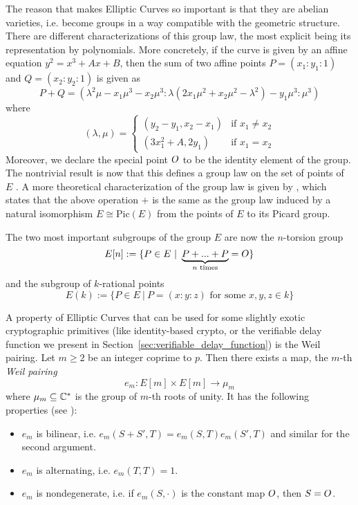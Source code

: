 The reason that makes Elliptic Curves so important is that they are abelian varieties, i.e. become groups in a way compatible with the geometric structure.
There are different characterizations of this group law, the most explicit being its representation by polynomials.
More concretely, if the curve is given by an affine equation $y^2 = x^3 + Ax + B$, then the sum of two affine points $P = (x_1 : y_1 : 1)$ and $Q = (x_2 : y_2 : 1)$ is given as
\begin{equation*}
    P + Q = ( \lambda^2\mu - x_1\mu^3 - x_2\mu^3 : \lambda(2x_1\mu^2 + x_2\mu^2 - \lambda^2) - y_1\mu^3 : \mu^3 )
\end{equation*}
where
\begin{equation*}
    (\lambda, \mu) = \begin{cases}
        (y_2 - y_1, x_2 - x_1) & \text{if $x_1 \neq x_2$} \\
        (3x_1^2 + A, 2y_1) & \text{if $x_1 = x_2$}
    \end{cases}
\end{equation*}
Moreover, we declare the special point $O$ to be the identity element of the group.
The nontrivial result is now that this defines a group law on the set of points of $E$ \cite[Prop.~III.2.2]{arithmetic_elliptic_curves}. 
A more theoretical characterization of the group law is given by \cite[Prop.~III.3.4]{arithmetic_elliptic_curves}, which states that the above operation $+$ is the same as the group law induced by a natural isomorphism $E \cong \mathrm{Pic}(E)$ from the points of $E$ to its Picard group. 

The two most important subgroups of the group $E$ are now the $n$-torsion group
\begin{equation*}
    E[n] := \{ P \in E \ | \ \underbrace{P + ... + P}_{\text{$n$ times}} = \IdPoint \}
\end{equation*}
and the subgroup of $k$-rational points
\begin{equation*}
    E(k) := \{ P \in E \ | \ \text{$P = (x : y : z)$ for some $x, y, z \in k$} \}
\end{equation*}

A property of Elliptic Curves that can be used for some slightly exotic cryptographic primitives (like identity-based crypto, or the verifiable delay function we present in Section~\ref{sec:verifiable_delay_function}) is the Weil pairing.
Let $m \geq 2$ be an integer coprime to $p$.
Then there exists a map, the $m$-th \emph{Weil pairing}
\begin{equation*}
    e_m: E[m] \times E[m] \to \mu_m
\end{equation*}
where $\mu_m \subseteq \mathbb{C}^*$ is the group of $m$-th roots of unity.
It has the following properties (see \cite[Prop.~III.8.1]{arithmetic_elliptic_curves}):
\begin{itemize}
    \item $e_m$ is bilinear, i.e. $e_m(S + S', T) = e_m(S, T)e_m(S', T)$ and similar for the second argument.
    \item $e_m$ is alternating, i.e. $e_m(T, T) = 1$.
    \item $e_m$ is nondegenerate, i.e. if $e_m(S, \cdot)$ is the constant map $O$, then $S = O$.
\end{itemize}

